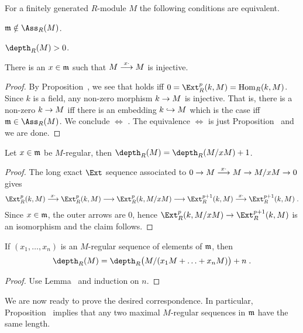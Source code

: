 \documentclass[a4paper,parskip=half,numbers=enddot, DIV=12]{scrreprt}
\begin{document}
\begin{lem}
	For a finitely generated $R$-module $M$ the following conditions are equivalent.
	\begin{alphanumerate}
		\item $\mm\notin\Ass_R(M)$.
		\item $\depth_R(M)>0$.
		\item There is an $x\in \mathfrak{m}$ such that $M\morphism[x\cdot ]M$ is injective.
	\end{alphanumerate}
\end{lem}
\begin{proof}
	By Proposition~, we see that  holds iff $0=\Ext_R^p(k,M)=\Hom_R(k,M)$. Since $k$ is a field, any non-zero morphism $k\morphism M$ is injective. That is, there is a non-zero $k\morphism M$ iff there is an embedding $k\monomorphism M$ which is the case iff $\mm\in\Ass_R(M)$. We conclude  $\Leftrightarrow$ . The equivalence  $\Leftrightarrow$  is just Proposition~ and we are done.
\end{proof}
\begin{lem}
	Let $x\in \mathfrak{m}$ be $M$-regular, then $\depth_R(M)=\depth_R(M/xM)+1$\;.
\end{lem}
\begin{proof}
	The long exact $\Ext$ sequence associated to $0\morphism M\morphism[x\cdot ]M\morphism M/xM\morphism 0$ gives
	\begin{align*}
		\Ext_R^p(k,M)\morphism[x\cdot]\Ext_R^p(k,M)\morphism\Ext_R^p(k,M/xM)\morphism\Ext_R^{p+1}(k,M)\morphism[x\cdot]\Ext_R^{p+1}(k,M)\;.
	\end{align*}
	Since $x\in\mathfrak{m}$, the outer arrows are $0$, hence $\Ext_R^p(k,M/xM)\morphism\Ext_R^{p+1}(k,M)$ is an isomorphism and the claim follows.
\end{proof}
\begin{cor}
	If $(x_1,\ldots,x_n)$ is an $M$-regular sequence of elements of $\mathfrak{m}$, then
	\begin{align*}
		\depth_R(M)=\depth_R\big(M/(x_1M+\ldots+x_nM)\big)+n\;.
	\end{align*}
\end{cor}
\begin{proof}
	Use Lemma~ and induction on $n$.
\end{proof}
We are now ready to prove the desired correspondence. In particular, Proposition~ implies that any two maximal $M$-regular sequences in $\mathfrak{m}$ have the same length.
\end{document}
